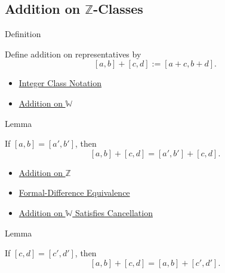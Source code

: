 \subsection*{\texorpdfstring{Addition on $\mathbb{Z}$-Classes}{Addition on Z-Classes}}

\begin{definitionbox}{Definition}
\begin{definition}
\label{def:addition-on-z-classes}
Define addition on representatives by
\[
[a,b]+[c,d]:=[a+c,b+d].
\]
\end{definition}
\end{definitionbox}

\begin{dependencies}
\begin{itemize}
  \item \hyperref[def:integer-class-notation]{Integer Class Notation}
  \item \hyperref[def:addition-on-w]{Addition on $\mathbb{W}$}
\end{itemize}
\end{dependencies}

\begin{lemmabox}{Lemma}
\begin{lemma}
\label{lem:addition-on-z-classes-respects-left-equivalence}
If $[a,b]=[a',b']$, then
\[
[a,b]+[c,d]=[a',b']+[c,d].
\]
\end{lemma}
\end{lemmabox}

\begin{dependencies}
\begin{itemize}
  \item \hyperref[def:addition-on-z-classes]{Addition on $\mathbb{Z}$}
  \item \hyperref[def:formal-difference-equivalence]{Formal-Difference Equivalence}
  \item \hyperref[thm:addition-on-w-cancellation]{Addition on $\mathbb{W}$ Satisfies Cancellation}
\end{itemize}
\end{dependencies}

\begin{lemmabox}{Lemma}
\begin{lemma}
\label{lem:addition-on-z-classes-respects-right-equivalence}
If $[c,d]=[c',d']$, then
\[
[a,b]+[c,d]=[a,b]+[c',d'].
\]
\end{lemma}
\end{lemmabox}

